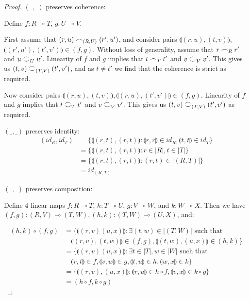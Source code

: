 \documentclass[11pt, oneside]{article}
\theoremstyle{plain}
\theoremstyle{definition}
\newcommand{\lp}{\llparenthesis}
\newcommand{\rp}{\rrparenthesis}
\newcommand{\coh}[1][]{\mathrel{\vcenter{\offinterlineskip\hbox{$\frown$}\vskip0.2ex\hbox{$\smile$}}_{\ifx\\#1\\\else#1\fi}}}
\newcommand{\scoh}[1][]{\mathrel{\frown}_{\ifx\\#1\\\else#1\fi}}
\newcommand{\comp}{\mathbin{\circ}}
\begin{document}
\begin{proof}

    $(\_,\_)$ preserves coherence:
    \begin{adjustwidth}{1.5em}{}
        Define $f:R\multimap T$, $g:U\multimap V$.

        First assume that $(r,u)\scoh[(R,U)](r',u')$, and consider pairs $\lp(r,u),(t,v)\rp$, $\lp(r',u'),(t',v')\rp\in(f,g)$.
        Without loss of generality, assume that $r\scoh[R]r'$ and $u\coh[U]u'$.
        Linearity of $f$ and $g$ implies that $t\scoh[T]t'$ and $v\coh[V]v'$.
        This gives us $(t,v)\coh[(T,V)](t',v')$, and as $t\neq t'$ we find that the coherence is strict as required.

        Now consider pairs $\lp(r,u),(t,v)\rp,\lp(r,u),(t',v')\rp\in(f,g)$.
        Linearity of $f$ and $g$ implies that $t\coh[T]t'$ and $v\coh[V]v'$.
        This gives us $(t,v)\coh[(T,V)](t',v')$ as required.

    \end{adjustwidth}

    $(\_,\_)$ preserves identity:
    \begin{align*}
        (id_R,id_T) &= \{
            \lp(r,t),(r,t)\rp:\lp r,r\rp\in id_R,\lp t,t\rp\in id_T
        \} \\
        &= \{\lp(r,t),(r,t)\rp:r\in |R|,t\in |T|\} \\
        &= \{\lp(r,t),(r,t)\rp:(r,t)\in|(R,T)|\} \\
        &= id_{(R,T)}
    \end{align*}

    $(\_,\_)$ preserves composition:
    \begin{adjustwidth}{1.5em}{}
        Define 4 linear maps
        $f : R\multimap T$,
        $h : T\multimap U$,
        $g : V\multimap W$,
    and $k : W\multimap X$.
    Then we have $(f,g):(R,V)\multimap(T,W),(h,k):(T,W)\multimap(U,X)$, and:
    \end{adjustwidth}

    \begin{align*}
        (h,k)\comp(f,g) &= \{
            \lp(r,v)(u,x)\rp:\exists(t,w)\in|(T,W)| \text{ such that}\\
            &\quad\lp(r,v),(t,w)\rp\in(f,g),\lp(t,w),(u,x)\rp\in(h,k)
        \} \\
        &= \{
            \lp(r,v)(u,x)\rp:\exists t\in|T|,w\in|W| \text{ such that} \\
            &\quad\lp r,t\rp\in f,\lp v,w\rp\in g,\lp t,u\rp\in h,\lp w,x\rp\in k
        \} \\
        &= \{
            \lp(r,v),(u,x)\rp:\lp r,u\rp\in h\comp f,\lp v,x\rp\in k\comp g
        \} \\
        &= (h\comp f,k\comp g)
    \end{align*}

\end{proof}
\end{document}
